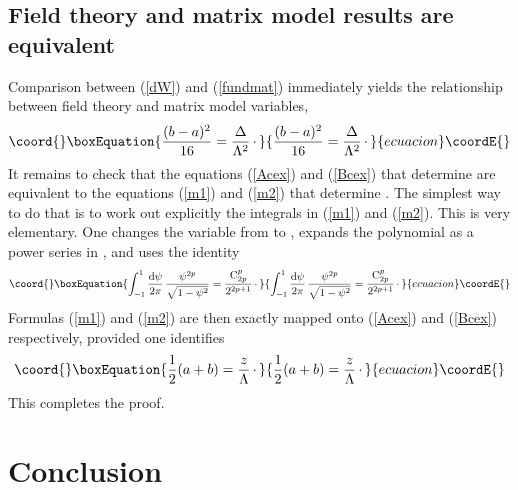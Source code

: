 \documentclass[a4paper,12pt]{article}
\def\d{{\rm d}}
\def\C{{\rm C}}\def\F{{\cal F}}
\begin{document}
%
\subsection{Field theory and matrix model results are equivalent}
%

Comparison between (\ref{dW}) and (\ref{fundmat}) immediately yields the 
relationship between field theory and matrix model variables,
%
\begin{equation}\coord{}\boxEquation{
\label{r1}
{(b-a)^{2}\over 16} = {\Delta\over\L^{2}}\,\cdotp
}{
{(b-a)^{2}\over 16} = {\Delta\over\L^{2}}\,\cdotp
}{ecuacion}\coordE{}\end{equation}
%
It remains to check that the equations (\ref{Acex}) and (\ref{Bcex}) that 
determine \myHighlight{$\Delta$}\coordHE{} are equivalent to the equations (\ref{m1}) and
(\ref{m2}) that determine \coordHE{}. The simplest way to do that is to work 
out explicitly the integrals in (\ref{m1}) and (\ref{m2}). This is very 
elementary. One changes the variable from \myHighlight{$\varphi$}\coordHE{} to \coordHE{}, expands the polynomial
\coordHE{} as a power series in \myHighlight{$\psi$}\coordHE{}, and uses the identity
%
\begin{equation}\coord{}\boxEquation{
\label{intf}
\int_{-1}^{1}{\d\psi\over 2\pi}\, {\psi^{2p}\over\sqrt{1-\psi^{2}}} = 
{\C_{2p}^{p}\over 2^{2p+1}}\,\cdotp
}{
\int_{-1}^{1}{\d\psi\over 2\pi}\, {\psi^{2p}\over\sqrt{1-\psi^{2}}} = 
{\C_{2p}^{p}\over 2^{2p+1}}\,\cdotp
}{ecuacion}\coordE{}\end{equation}
%
Formulas (\ref{m1}) and (\ref{m2}) are then exactly mapped onto 
(\ref{Acex}) and (\ref{Bcex}) respectively, provided one identifies
%
\begin{equation}\coord{}\boxEquation{
\label{r2}
{1\over 2} (a+b) = {z\over\L}\,\cdotp
}{
{1\over 2} (a+b) = {z\over\L}\,\cdotp
}{ecuacion}\coordE{}\end{equation}
%
This completes the proof.

%
\section{Conclusion}
%
\end{document}
